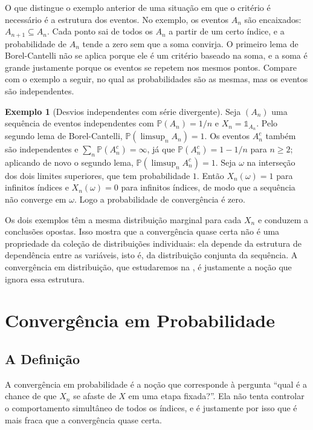 \documentclass[12pt,portuguese]{article}
\theoremstyle{definition}
\newtheorem{example}[example]{Exemplo}
\theoremstyle{plainexercise}
\theoremstyle{starredexercise}
\theoremstyle{definition}
\begin{document}
O que distingue o exemplo anterior de uma situação em que o critério é
necessário é a estrutura dos eventos. No exemplo, os eventos $A_n$ são
encaixados: $A_{n+1}\subseteq A_n$. Cada ponto sai de todos os $A_n$ a partir
de um certo índice, e a probabilidade de $A_n$ tende a zero sem que a soma
convirja. O primeiro lema de Borel-Cantelli não se aplica porque ele é um
critério baseado na soma, e a soma é grande justamente porque os eventos se
repetem nos mesmos pontos. Compare com o exemplo a seguir, no qual as
probabilidades são as mesmas, mas os eventos são independentes.

\begin{example}[Desvios independentes com série divergente]\label{ex:qc-independentes}
Seja $(A_n)$ uma sequência de eventos independentes com $\mathbb{P}(A_n)=1/n$ e
$X_n=\mathds{1}_{A_n}$. Pelo segundo lema de Borel-Cantelli,
$\mathbb{P}(\limsup_n A_n)=1$. Os eventos $A_n^c$ também são independentes e
$\sum_n\mathbb{P}(A_n^c)=\infty$, já que $\mathbb{P}(A_n^c)=1-1/n$ para
$n\geqslant2$; aplicando de novo o segundo lema,
$\mathbb{P}(\limsup_n A_n^c)=1$. Seja $\omega$ na interseção dos dois limites
superiores, que tem probabilidade $1$. Então $X_n(\omega)=1$ para infinitos
índices e $X_n(\omega)=0$ para infinitos índices, de modo que a sequência não
converge em $\omega$. Logo a probabilidade de convergência é zero.
\end{example}

Os dois exemplos têm a mesma distribuição marginal para cada $X_n$ e conduzem a
conclusões opostas. Isso mostra que a convergência quase certa não é uma
propriedade da coleção de distribuições individuais: ela depende da estrutura de
dependência entre as variáveis, isto é, da distribuição conjunta da sequência.
A convergência em distribuição, que estudaremos na , é
justamente a noção que ignora essa estrutura.

\section{Convergência em Probabilidade}\label{sec:probabilidade}

\subsection{A Definição}\label{subsec:prob-definicao}

A convergência em probabilidade é a noção que corresponde à pergunta
``qual é a chance de que $X_n$ se afaste de $X$ em uma etapa fixada?''. Ela não
tenta controlar o comportamento simultâneo de todos os índices, e é justamente
por isso que é mais fraca que a convergência quase certa.
\end{document}
